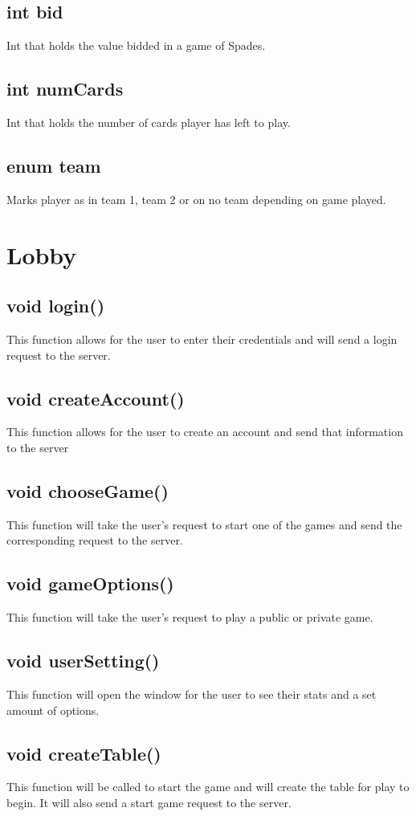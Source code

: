 \documentclass[]{scrartcl}
\begin{document}
\subsection{int bid}
	Int that holds the value bidded in a game of Spades.
\subsection{int numCards}
	Int that holds the number of cards player has left to play.
\subsection{enum team}
	Marks player as in team 1, team 2 or on no team depending on game played.


\section{Lobby}
\subsection{void login()}
	This function allows for the user to enter their credentials and will send a login request to the server. 
\subsection{void createAccount()}
	This function allows for the user to create an account and send that information to the server
\subsection{void chooseGame()}
	This function will take the user's request to start one of the games and send the corresponding request to the server.
\subsection{void gameOptions()}
	This function will take the user's request to play a public or private game.
\subsection{void userSetting()}
	This function will open the window for the user to see their stats and a set amount of options.
\subsection{void createTable()}
	This function will be called to start the game and will create the table for play to begin. It will also send a start game request to the server.
\end{document}
